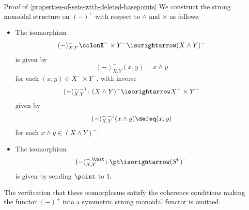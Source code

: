 \begin{Proof}{Proof of \cref{properties-of-sets-with-deleted-basepoints}}
    We construct the strong monoidal structure on $(-)^{+}$ with respect to $\wedge$ and $\times$ as follows:
    \begin{itemize}
        \item{}The isomorphism
            \[
                (-)^{-}_{X,Y}%
                \colon%
                X^{-}\times Y^{-}%
                \isorightarrow
                (X\wedge Y)^{-}
            \]%
            is given by
            \[
                (-)^{-}_{X,Y}(x,y)%
                =%
                x\wedge y
            \]%
            for each $(x,y)\in X^{-}\times Y^{-}$, with inverse
            \[
                (-)^{-,-1}_{X,Y}
                \colon%
                (X\wedge Y)^{-}
                \isorightarrow
                X^{-}\times Y^{-}%
            \]%
            given by
            \[
                (-)^{-,-1}_{X,Y}(x\wedge y)%
                \defeq%
                (x,y)%
            \]%
            for each $x\wedge y\in(X\wedge Y)^{-}$.
        \item{}The isomorphism
            \[
                (-)^{-,\Unit}_{X,Y}%
                \colon%
                \pt%
                \isorightarrow
                (S^{0})^{-}%
            \]%
            is given by sending $\point$ to $1$.
    \end{itemize}
    The verification that these isomorphisms satisfy the coherence conditions making the functor $(-)^{+}$ into a symmetric strong monoidal functor is omitted.
\end{Proof}
\begin{appendices}

\end{appendices}

